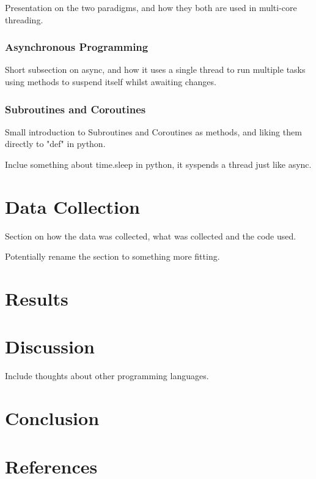 \documentclass{article}
\begin{document}
Presentation on the two paradigms, and how they both are used in multi-core threading.

\subsubsection{Asynchronous Programming}

Short subsection on async, and how it uses a single thread to run multiple tasks using methods to suspend itself whilst awaiting changes.

\subsubsection{Subroutines and Coroutines}

Small introduction to Subroutines and Coroutines as methods, and liking them directly to "def" in python.

Inclue something about time.sleep in python, it syspends a thread just like async.

\section{Data Collection}

Section on how the data was collected, what was collected and the code used. 

Potentially rename the section to something more fitting.

\section{Results}



\section{Discussion}

Include thoughts about other programming languages.

\section{Conclusion}
\newpage
\section{References}
\printbibliography
\end{document}
